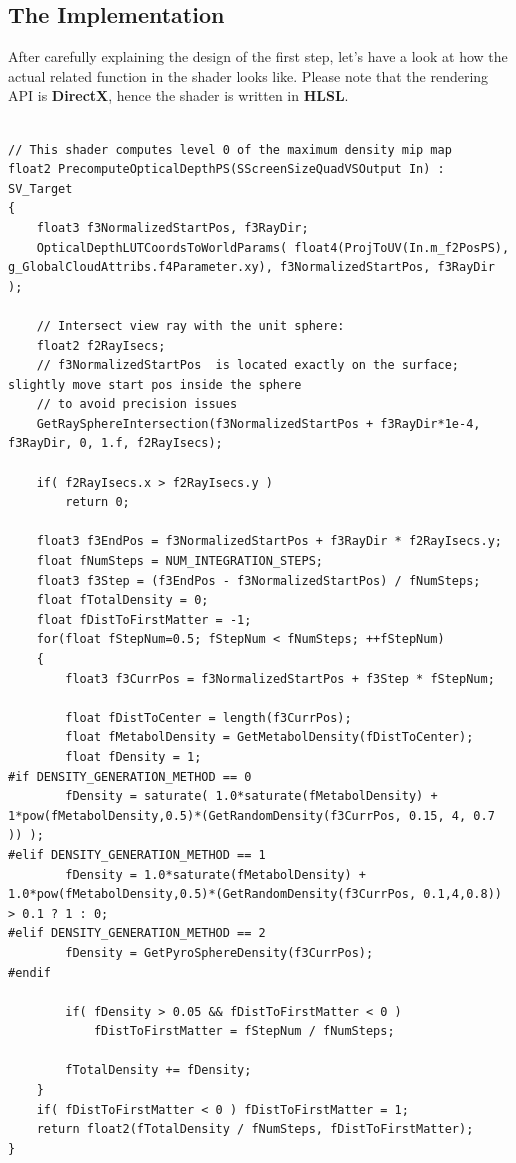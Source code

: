 \subsection{The Implementation}
After carefully explaining the design of the first step, let's have a look at how the actual related function in the shader looks like. Please note that the rendering API is \textbf{DirectX}, hence the shader is written in \textbf{HLSL}.\\\\
\begin{lstlisting}
// This shader computes level 0 of the maximum density mip map
float2 PrecomputeOpticalDepthPS(SScreenSizeQuadVSOutput In) : SV_Target
{
    float3 f3NormalizedStartPos, f3RayDir;
    OpticalDepthLUTCoordsToWorldParams( float4(ProjToUV(In.m_f2PosPS), g_GlobalCloudAttribs.f4Parameter.xy), f3NormalizedStartPos, f3RayDir );
    
    // Intersect view ray with the unit sphere:
    float2 f2RayIsecs;
    // f3NormalizedStartPos  is located exactly on the surface; slightly move start pos inside the sphere
    // to avoid precision issues
    GetRaySphereIntersection(f3NormalizedStartPos + f3RayDir*1e-4, f3RayDir, 0, 1.f, f2RayIsecs);
    
    if( f2RayIsecs.x > f2RayIsecs.y )
        return 0;

    float3 f3EndPos = f3NormalizedStartPos + f3RayDir * f2RayIsecs.y;
    float fNumSteps = NUM_INTEGRATION_STEPS;
    float3 f3Step = (f3EndPos - f3NormalizedStartPos) / fNumSteps;
    float fTotalDensity = 0;
    float fDistToFirstMatter = -1;
    for(float fStepNum=0.5; fStepNum < fNumSteps; ++fStepNum)
    {
        float3 f3CurrPos = f3NormalizedStartPos + f3Step * fStepNum;
        
        float fDistToCenter = length(f3CurrPos);
        float fMetabolDensity = GetMetabolDensity(fDistToCenter);
        float fDensity = 1;
#if DENSITY_GENERATION_METHOD == 0
        fDensity = saturate( 1.0*saturate(fMetabolDensity) + 1*pow(fMetabolDensity,0.5)*(GetRandomDensity(f3CurrPos, 0.15, 4, 0.7 )) );
#elif DENSITY_GENERATION_METHOD == 1
        fDensity = 1.0*saturate(fMetabolDensity) + 1.0*pow(fMetabolDensity,0.5)*(GetRandomDensity(f3CurrPos, 0.1,4,0.8)) > 0.1 ? 1 : 0;
#elif DENSITY_GENERATION_METHOD == 2
        fDensity = GetPyroSphereDensity(f3CurrPos);
#endif

        if( fDensity > 0.05 && fDistToFirstMatter < 0 )
            fDistToFirstMatter = fStepNum / fNumSteps;
       
        fTotalDensity += fDensity;
    }
    if( fDistToFirstMatter < 0 ) fDistToFirstMatter = 1;
    return float2(fTotalDensity / fNumSteps, fDistToFirstMatter);
}
\end{lstlisting}


